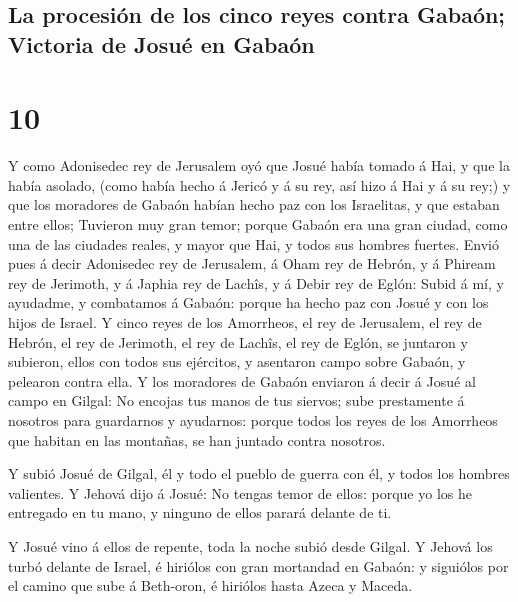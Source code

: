 \hypertarget{la-procesiuxf3n-de-los-cinco-reyes-contra-gabauxf3n-victoria-de-josuuxe9-en-gabauxf3n}{%
\subsection{La procesión de los cinco reyes contra Gabaón; Victoria de
Josué en
Gabaón}\label{la-procesiuxf3n-de-los-cinco-reyes-contra-gabauxf3n-victoria-de-josuuxe9-en-gabauxf3n}}

\hypertarget{section-9}{%
\section{10}\label{section-9}}

 Y como Adonisedec rey de Jerusalem oyó que Josué había
tomado á Hai, y que la había asolado, (como había hecho á Jericó y á su
rey, así hizo á Hai y á su rey;) y que los moradores de Gabaón habían
hecho paz con los Israelitas, y que estaban entre ellos; 
Tuvieron muy gran temor; porque Gabaón era una gran ciudad, como una de
las ciudades reales, y mayor que Hai, y todos sus hombres fuertes.
 Envió pues á decir Adonisedec rey de Jerusalem, á Oham
rey de Hebrón, y á Phiream rey de Jerimoth, y á Japhia rey de Lachîs, y
á Debir rey de Eglón:  Subid á mí, y ayudadme, y
combatamos á Gabaón: porque ha hecho paz con Josué y con los hijos de
Israel.  Y cinco reyes de los Amorrheos, el rey de
Jerusalem, el rey de Hebrón, el rey de Jerimoth, el rey de Lachîs, el
rey de Eglón, se juntaron y subieron, ellos con todos sus ejércitos, y
asentaron campo sobre Gabaón, y pelearon contra ella.  Y
los moradores de Gabaón enviaron á decir á Josué al campo en Gilgal: No
encojas tus manos de tus siervos; sube prestamente á nosotros para
guardarnos y ayudarnos: porque todos los reyes de los Amorrheos que
habitan en las montañas, se han juntado contra nosotros.

 Y subió Josué de Gilgal, él y todo el pueblo de guerra
con él, y todos los hombres valientes.  Y Jehová dijo á
Josué: No tengas temor de ellos: porque yo los he entregado en tu mano,
y ninguno de ellos parará delante de ti.

 Y Josué vino á ellos de repente, toda la noche subió
desde Gilgal.  Y Jehová los turbó delante de Israel, é
hiriólos con gran mortandad en Gabaón: y siguiólos por el camino que
sube á Beth-oron, é hiriólos hasta Azeca y Maceda.

